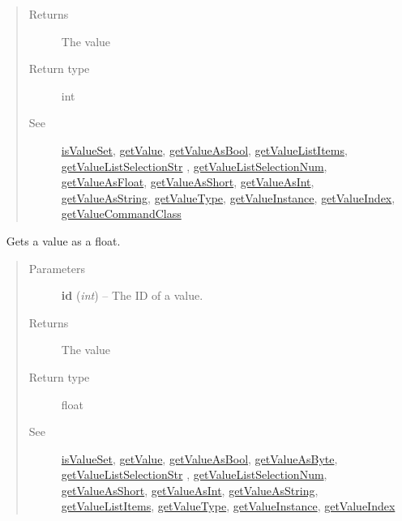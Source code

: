 \documentclass[letterpaper,10pt,english]{sphinxmanual}
\begin{document}
\begin{fulllineitems}
\begin{fulllineitems}
\begin{quote}
\begin{description}
\item[{Returns}] \leavevmode
The value

\item[{Return type}] \leavevmode
int

\item[{See}] \leavevmode
{\hyperref[libopenzwave:isvalueset]{isValueSet}}, {\hyperref[libopenzwave:getvalue]{getValue}}, {\hyperref[libopenzwave:getvalueasbool]{getValueAsBool}}, {\hyperref[libopenzwave:getvaluelistitems]{getValueListItems}}, {\hyperref[libopenzwave:getvaluelistselectionstr]{getValueListSelectionStr}} , {\hyperref[libopenzwave:getvaluelistselectionnum]{getValueListSelectionNum}}, {\hyperref[libopenzwave:getvalueasfloat]{getValueAsFloat}}, {\hyperref[libopenzwave:getvalueasshort]{getValueAsShort}}, {\hyperref[libopenzwave:getvalueasint]{getValueAsInt}}, {\hyperref[libopenzwave:getvalueasstring]{getValueAsString}}, {\hyperref[libopenzwave:getvaluetype]{getValueType}}, {\hyperref[libopenzwave:getvalueinstance]{getValueInstance}}, {\hyperref[libopenzwave:getvalueindex]{getValueIndex}}, {\hyperref[libopenzwave:getvaluecommandclass]{getValueCommandClass}}

\end{description}\end{quote}

\end{fulllineitems}


\begin{fulllineitems}
\label{libopenzwave:libopenzwave.PyManager.getValueAsFloat}~\label{libopenzwave:getvalueasfloat}
Gets a value as a float.
\begin{quote}\begin{description}
\item[{Parameters}] \leavevmode
\textbf{id} (\emph{int}) -- The ID of a value.

\item[{Returns}] \leavevmode
The value

\item[{Return type}] \leavevmode
float

\item[{See}] \leavevmode
{\hyperref[libopenzwave:isvalueset]{isValueSet}}, {\hyperref[libopenzwave:getvalue]{getValue}}, {\hyperref[libopenzwave:getvalueasbool]{getValueAsBool}}, {\hyperref[libopenzwave:getvalueasbyte]{getValueAsByte}}, {\hyperref[libopenzwave:getvaluelistselectionstr]{getValueListSelectionStr}} , {\hyperref[libopenzwave:getvaluelistselectionnum]{getValueListSelectionNum}}, {\hyperref[libopenzwave:getvalueasshort]{getValueAsShort}}, {\hyperref[libopenzwave:getvalueasint]{getValueAsInt}}, {\hyperref[libopenzwave:getvalueasstring]{getValueAsString}}, {\hyperref[libopenzwave:getvaluelistitems]{getValueListItems}}, {\hyperref[libopenzwave:getvaluetype]{getValueType}}, {\hyperref[libopenzwave:getvalueinstance]{getValueInstance}}, {\hyperref[libopenzwave:getvalueindex]{getValueIndex}}


\end{description}
\end{quote}
\end{fulllineitems}
\end{fulllineitems}
\end{document}
